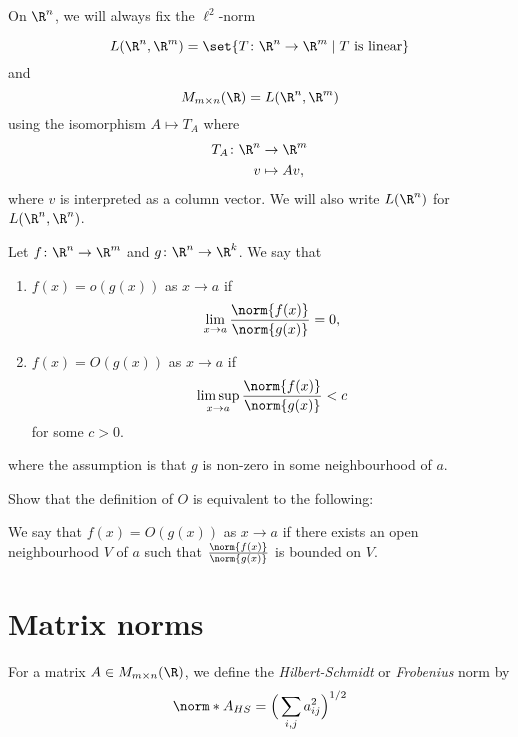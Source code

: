 On $\R^n$, we will always fix the $\ell^2$-norm

\begin{notation}
    \[
        L(\R^n, \R^m) = \set{T\colon \R^n \to \R^m \mid T \text{ is linear}}
    \] and \[
        M_{m \times n}(\R) = L(\R^n, \R^m)
    \] using the isomorphism $A \mapsto T_A$ where \begin{align*}
    T_A\colon \R^n &\to \R^m \\
          v &\mapsto Av,
    \end{align*} where $v$ is interpreted as a column vector.
    We will also write $L(\R^n)$ for $L(\R^n, \R^n)$.
\end{notation}


\begin{definition*}[$O$ notation] \label{def:o}
    Let $f\colon \R^n \to \R^m$ and $g\colon \R^n \to \R^k$.
    We say that
    \begin{enumerate}
        \item $f(x) = o(g(x))$ as $x \to a$ if \[
            \lim_{x \to a} \frac{\norm{f(x)}}{\norm{g(x)}} = 0,
        \]
        \item $f(x) = O(g(x))$ as $x \to a$ if \[
            \limsup_{x \to a} \frac{\norm{f(x)}}{\norm{g(x)}} < c
        \] for some $c > 0$.
    \end{enumerate}
    where the assumption is that $g$ is non-zero in some
    neighbourhood of $a$.
\end{definition*}

\begin{exercise}
    Show that the definition of $O$ is equivalent to the following:

    We say that $f(x) = O(g(x))$ as $x \to a$ if there exists an open
    neighbourhood $V$\/ of $a$ such that $\frac{\norm{f(x)}}{\norm{g(x)}}$
    is bounded on $V$.
\end{exercise}

\begin{exercise}
    
\end{exercise}

\section{Matrix norms} \label{sec:matrix-norms}

\begin{definition*} \label{def:hsn}
    For a matrix $A \in M_{m \times n}(\R)$, we define the
    \emph{Hilbert-Schmidt} or \emph{Frobenius} norm by \[
        \hsn A = \Big(\sum_{i,j} a_{ij}^2\Big)^{1/2}
    \]
\end{definition*}


